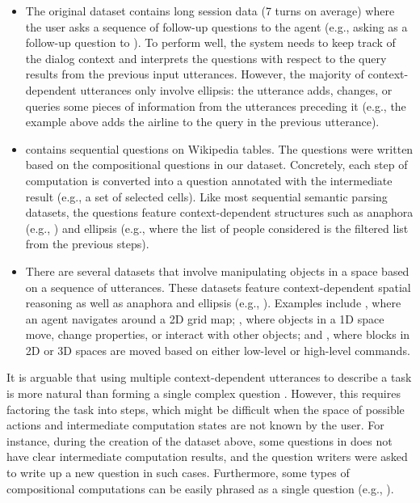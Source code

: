 \begin{itemize}
\item The original  dataset \cite{dahl1994expanding}
contains long session data (7 turns on average)
where the user asks a sequence of follow-up questions
to the agent
(e.g., asking 
as a follow-up question to ).
To perform well,
the system needs to keep track of the dialog context
and interprets the questions with respect to the query results
from the previous input utterances.
However, the majority of context-dependent utterances
only involve ellipsis:
the utterance adds, changes, or queries
some pieces of information
from the utterances preceding it
(e.g., the  example above
adds the airline to the query in the previous utterance).

\item {} \cite{iyyer2017search}
contains sequential questions on Wikipedia tables.
The questions were written based on the compositional questions
in our \wtq dataset.
Concretely, each step of computation is converted into a question
annotated with the intermediate result (e.g., a set of selected cells).
Like most sequential semantic parsing datasets,
the questions feature context-dependent structures
such as anaphora (e.g., )
and ellipsis (e.g.,  where the list of people considered is the filtered list
from the previous steps).

\item There are several datasets that involve
manipulating objects in a space
based on a sequence of utterances.
These datasets feature context-dependent spatial reasoning
as well as anaphora and ellipsis
(e.g., ).
Examples include
 \cite{macmahon2006walk,chen11navigate},
where an agent navigates around a 2D grid map;
 \cite{long2016projections},
where objects in a 1D space move, change properties,
or interact with other objects;
and  \cite{bisk2016natural},
where blocks in 2D or 3D spaces are moved
based on either low-level or high-level commands.

\end{itemize}

It is arguable that using multiple context-dependent utterances
to describe a task is more natural than
forming a single complex question
\cite{iyyer2017search}.
However, this requires factoring the task into steps,
which might be difficult when the space of possible actions
and intermediate computation states
are not known by the user.
For instance,
during the creation of the  dataset above,
some questions in \wtq does not have clear intermediate computation results,
and the question writers were asked to write up a new question
in such cases.
Furthermore, some types of compositional computations can
be easily phrased as a single question
(e.g., ).

